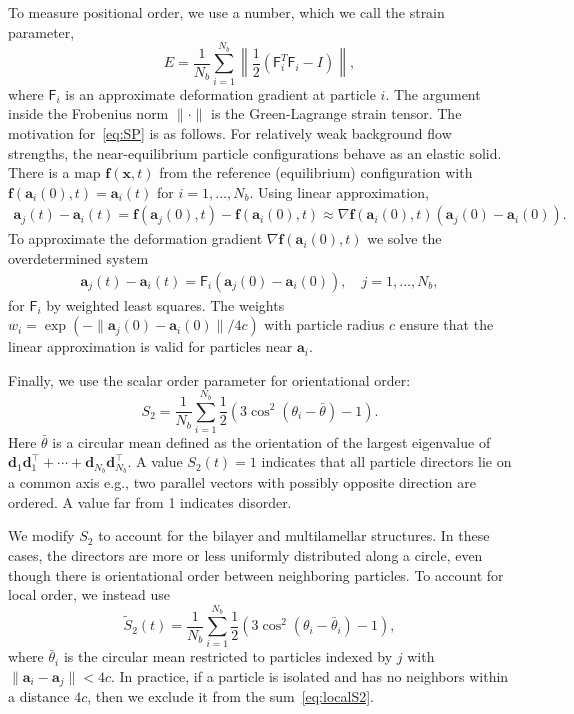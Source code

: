 \documentclass[prb,preprint,showpacs,preprintnumbers,amsmath,amssymb,longbibliography]{revtex4-1}
\renewcommand{\aa}{\mathbf{a}}
\newcommand{\dd}{\mathbf{d}}
\newcommand{\ff}{\mathbf{f}}
\newcommand{\xx}{\mathbf{x}}
\begin{document}
To measure positional order, we use a number, which we call the strain
parameter, 
\begin{equation}
\label{eq:SP}
E = \frac{1}{N_b} \sum_{i=1}^{N_b}
\left\|\frac{1}{2}(\mathsf{F}_i^T \mathsf{F}_i - I)\right\|,
\end{equation}
where $\mathsf{F}_i$ is an approximate deformation gradient at particle
$i$. The argument inside the Frobenius norm $\| \cdot \|$ is the
Green-Lagrange strain tensor. The motivation for~\eqref{eq:SP} is as
follows. For relatively weak background flow strengths, the
near-equilibrium particle configurations behave as an elastic solid.
There is a map $\ff(\xx,t)$ from the reference (equilibrium)
configuration with $\ff(\aa_i(0),t) = \aa_i(t)$ for $i = 1,\ldots,N_b$.
Using linear approximation,
\begin{align}
\aa_j(t) - \aa_i(t) = \ff(\aa_j(0),t) - \ff(\aa_i(0),t)
\approx \nabla \ff(\aa_i(0),t)(\aa_j(0) - \aa_i(0)).
\end{align}
To approximate the deformation gradient $\nabla \ff(\aa_i(0),t)$ we
solve the overdetermined system 
\begin{align}
\aa_j(t) - \aa_i(t) = \mathsf{F}_i(\aa_j(0) - \aa_i(0)),\quad j =
  1,\ldots, N_b,
\end{align}
for $\mathsf{F}_i$ by weighted least squares. The weights $w_i =
\exp(-\|\aa_j(0) - \aa_i(0)\|/4c)$ with particle radius $c$ ensure that
the linear approximation is valid for particles near $\aa_i$.

Finally, we use the scalar order parameter for orientational order:
\begin{equation}
  \label{eq:S2}
S_2 = \frac{1}{N_b} \sum_{i=1}^{N_b} \frac{1}{2}(3\cos^2(\theta_i - \bar \theta) - 1).
\end{equation}
Here $\bar \theta$ is a circular mean defined as the orientation of the
largest eigenvalue of $\dd_1\dd_1^\top + \cdots +
\dd_{N_b}\dd_{N_b}^\top$. A value $S_2(t) = 1$ indicates that all
particle directors lie on a common axis e.g., two parallel vectors with
possibly opposite direction are ordered. A value far from 1 indicates
disorder.

We modify $S_2$ to account for the bilayer and multilamellar structures.
In these cases, the directors are more or less uniformly distributed
along a circle, even though there is orientational order between
neighboring particles. To account for local order, we instead use
\begin{equation}
  \label{eq:localS2}
\tilde{S}_2(t) = \frac{1}{N_b} \sum_{i=1}^{N_b}
\frac{1}{2}(3\cos^2(\theta_i - \bar \theta_i) - 1),
\end{equation}
where $\bar \theta_i$ is the circular mean restricted to particles
indexed by $j$ with $\|\aa_i - \aa_j\| < 4c$. In practice, if a particle
is isolated and has no neighbors within a distance $4c$, then we exclude
it from the sum~\eqref{eq:localS2}. 
\end{document}
